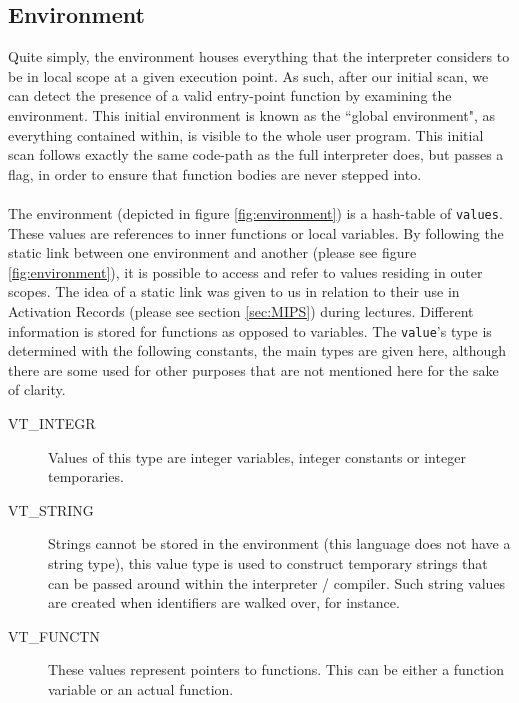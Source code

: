 \subsection{Environment}
Quite simply, the environment houses everything that the interpreter considers to be in local scope at a given execution point. As such, after our initial scan, we can detect the presence of a valid entry-point function by examining the environment. This initial environment is known as the ``global environment", as everything contained within, is visible to the whole user program. This initial scan follows exactly the same code-path as the full interpreter does, but passes a flag, in order to ensure that function bodies are never stepped into.
\ \\ \ \\
The environment (depicted in figure \ref{fig:environment}) is a hash-table of \verb!values!. These values are references to inner functions or local variables. By following the static link between one environment and another (please see figure \ref{fig:environment}), it is possible to access and refer to values residing in outer scopes. The idea of a static link was given to us in relation to their use in Activation Records (please see section \ref{sec:MIPS}) during lectures. Different information is stored for functions as opposed to variables. The \verb!value!'s type is determined with the following constants, the main types are given here, although there are some used for other purposes that are not mentioned here for the sake of clarity.

\begin{description}
	\item[VT\_INTEGR] Values of this type are integer variables, integer constants or integer temporaries.
	\item[VT\_STRING] Strings cannot be stored in the environment (this language does not have a string type), this value type is used to construct temporary strings that can be passed around within the interpreter / compiler. Such string values are created when identifiers are walked over, for instance.
	\item[VT\_FUNCTN] These values represent pointers to functions. This can be either a function variable or an actual function.
\end{description}

